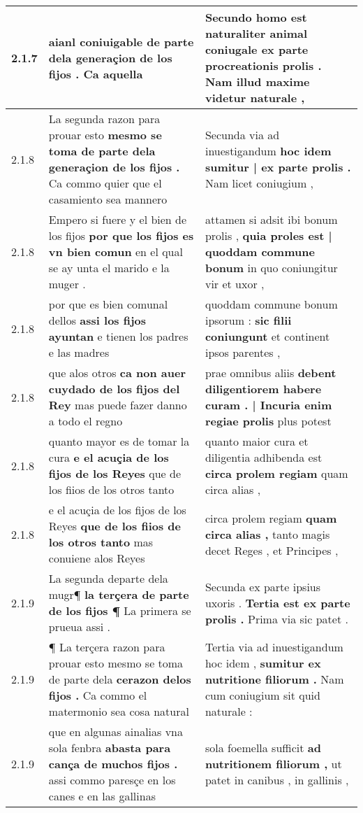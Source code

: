 \begin{tabular}{|p{1cm}|p{6.5cm}|p{6.5cm}|}
2.1.7 & aianl coniuigable \textbf{ de parte dela generaçion de los fijos . } Ca aquella & Secundo homo est naturaliter animal coniugale \textbf{ ex parte procreationis prolis . } Nam illud maxime videtur naturale , \\\hline
2.1.8 & La segunda razon para prouar esto \textbf{ mesmo se toma de parte dela generaçion de los fijos . } Ca commo quier que el casamiento sea mannero & Secunda via ad inuestigandum \textbf{ hoc idem sumitur | ex parte prolis . } Nam licet coniugium , \\\hline
2.1.8 & Empero si fuere y el bien de los fijos \textbf{ por que los fijos es vn bien comun } en el qual se ay unta el marido e la muger . & attamen si adsit ibi bonum prolis , \textbf{ quia proles est | quoddam commune bonum } in quo coniungitur vir et uxor , \\\hline
2.1.8 & por que es bien comunal dellos \textbf{ assi los fijos ayuntan } e tienen los padres e las madres & quoddam commune bonum ipsorum : \textbf{ sic filii coniungunt } et continent ipsos parentes , \\\hline
2.1.8 & que alos otros \textbf{ ca non auer cuydado de los fijos del Rey } mas puede fazer danno a todo el regno & prae omnibus aliis \textbf{ debent diligentiorem habere curam . | Incuria enim regiae prolis } plus potest \\\hline
2.1.8 & quanto mayor es de tomar la cura \textbf{ e el acuçia de los fijos de los Reyes } que de los fiios de los otros tanto & quanto maior cura et diligentia adhibenda est \textbf{ circa prolem regiam } quam circa alias , \\\hline
2.1.8 & e el acuçia de los fijos de los Reyes \textbf{ que de los fiios de los otros tanto } mas conuiene alos Reyes & circa prolem regiam \textbf{ quam circa alias , } tanto magis decet Reges , et Principes , \\\hline
2.1.9 & La segunda departe dela mugr¶ \textbf{ la terçera de parte de los fijos ¶ } La primera se prueua assi . & Secunda ex parte ipsius uxoris . \textbf{ Tertia est ex parte prolis . } Prima via sic patet . \\\hline
2.1.9 & ¶ La terçera razon para prouar esto mesmo se toma de parte dela \textbf{ cerazon delos fijos . } Ca commo el matermonio sea cosa natural & Tertia via ad inuestigandum hoc idem , \textbf{ sumitur ex nutritione filiorum . } Nam cum coniugium sit quid naturale : \\\hline
2.1.9 & que en algunas ainalias vna sola fenbra \textbf{ abasta para cança de muchos fijos . } assi commo paresçe en los canes e en las gallinas & sola foemella sufficit \textbf{ ad nutritionem filiorum , } ut patet in canibus , in gallinis , \\\hline

\end{tabular}
